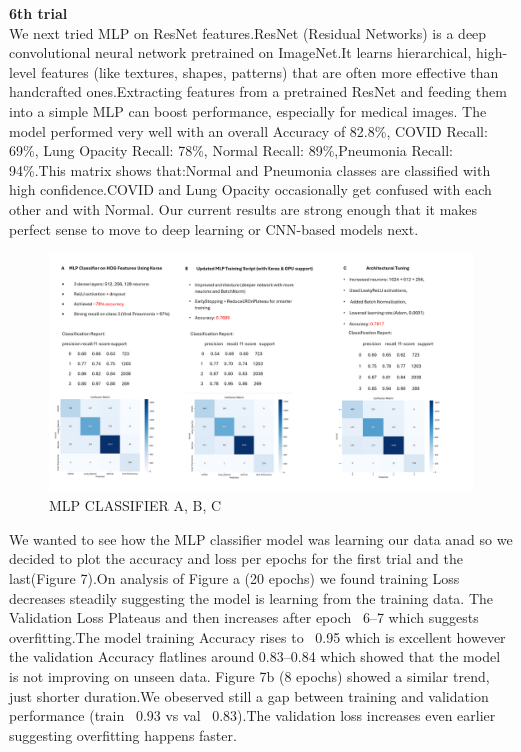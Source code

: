 \documentclass{article}
\begin{document}
\textbf{6th trial }\\
We next tried MLP on ResNet features.ResNet (Residual Networks) is a deep convolutional neural network pretrained on ImageNet.It learns hierarchical, high-level features (like textures, shapes, patterns) that are often more effective than handcrafted ones.Extracting features from a pretrained ResNet and feeding them into a simple MLP can boost performance, especially for medical images.
The model performed very well with an overall Accuracy of 82.8\%, COVID Recall: 69\%, Lung Opacity Recall: 78\%,    Normal Recall: 89\%,Pneumonia Recall: 94\%.This matrix shows that:Normal and Pneumonia classes are classified with high confidence.COVID and Lung Opacity occasionally get confused with each other and with Normal.
Our current results are strong enough that it makes perfect sense to move to deep learning or CNN-based models next.
\begin{figure}[ht] %
    \centering
    \includegraphics[width=1.0\linewidth]{mlpclassifier a,b,c.png}
    \caption{MLP CLASSIFIER A, B, C}
    \label{MLP CLASSIFIER}
\end{figure}
We wanted to see how the MLP classifier model was learning our data anad so we decided to plot the accuracy and loss per epochs for the first trial and the last(Figure 7).On analysis of Figure a (20 epochs) we found training Loss decreases steadily suggesting the model is learning from the training data.
The Validation Loss Plateaus and then increases after epoch ~6–7 which suggests overfitting.The model training Accuracy rises to ~0.95 which is excellent however the validation Accuracy flatlines around 0.83–0.84 which showed that the model is not improving on unseen data.
Figure 7b (8 epochs) showed a similar trend, just shorter duration.We obeserved  still a gap between training and validation performance (train ~0.93 vs val ~0.83).The validation loss increases even earlier suggesting overfitting happens faster.\\
\end{document}
